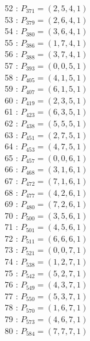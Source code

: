 \documentclass{article}
\begin{document}
{\begin{multicols}{3}
52 : $P_{371}=( 2, 5, 4, 1 )$\\
53 : $P_{379}=( 2, 6, 4, 1 )$\\
54 : $P_{380}=( 3, 6, 4, 1 )$\\
55 : $P_{386}=( 1, 7, 4, 1 )$\\
56 : $P_{388}=( 3, 7, 4, 1 )$\\
57 : $P_{393}=( 0, 0, 5, 1 )$\\
58 : $P_{405}=( 4, 1, 5, 1 )$\\
59 : $P_{407}=( 6, 1, 5, 1 )$\\
60 : $P_{419}=( 2, 3, 5, 1 )$\\
61 : $P_{423}=( 6, 3, 5, 1 )$\\
62 : $P_{438}=( 5, 5, 5, 1 )$\\
63 : $P_{451}=( 2, 7, 5, 1 )$\\
64 : $P_{453}=( 4, 7, 5, 1 )$\\
65 : $P_{457}=( 0, 0, 6, 1 )$\\
66 : $P_{468}=( 3, 1, 6, 1 )$\\
67 : $P_{472}=( 7, 1, 6, 1 )$\\
68 : $P_{477}=( 4, 2, 6, 1 )$\\
69 : $P_{480}=( 7, 2, 6, 1 )$\\
70 : $P_{500}=( 3, 5, 6, 1 )$\\
71 : $P_{501}=( 4, 5, 6, 1 )$\\
72 : $P_{511}=( 6, 6, 6, 1 )$\\
73 : $P_{521}=( 0, 0, 7, 1 )$\\
74 : $P_{538}=( 1, 2, 7, 1 )$\\
75 : $P_{542}=( 5, 2, 7, 1 )$\\
76 : $P_{549}=( 4, 3, 7, 1 )$\\
77 : $P_{550}=( 5, 3, 7, 1 )$\\
78 : $P_{570}=( 1, 6, 7, 1 )$\\
79 : $P_{573}=( 4, 6, 7, 1 )$\\
80 : $P_{584}=( 7, 7, 7, 1 )$\\
\end{multicols}


%


%


}%
\end{document}
